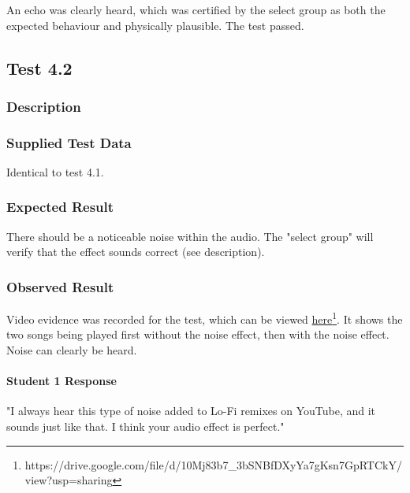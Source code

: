 \subsubsection{}
An echo was clearly heard, which was certified by the select group as both the expected behaviour and physically plausible. The test passed.


\pagebreak
\subsection{Test 4.2}
\subsubsection{Description}
\paragraph{}
{
	\centering
}

\subsubsection{Supplied Test Data}
Identical to test 4.1.

\subsubsection{Expected Result}
There should be a noticeable noise within the audio. The "select group" will verify that the effect sounds correct (see description).

\subsubsection{Observed Result}
\label{sec:evidence4.2}
Video evidence was recorded for the test, which can be viewed \href{https://drive.google.com/file/d/10Mj83b7_3bSNBfDXyYa7gKsn7GpRTCkY/view?usp=sharing}{here}\footnote{
	https://drive.google.com/file/d/10Mj83b7\_3bSNBfDXyYa7gKsn7GpRTCkY/view?usp=sharing
}. It shows the two songs being played first without the noise effect, then with the noise effect. Noise can clearly be heard.

\paragraph{Student 1 Response}
"I always hear this type of noise added to Lo-Fi remixes on YouTube, and it sounds just like that. I think your audio effect is perfect."


